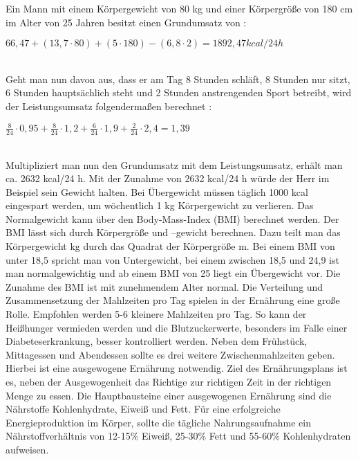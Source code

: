 	\setlength{\parindent}{0pt}Ein Mann mit einem Körpergewicht von 80 kg und einer Körpergröße von 180 cm im Alter von 25 Jahren besitzt einen Grundumsatz von \cite{SG}:\newline
	\\
		\centerline{$66,47 + (13,7 \cdot 80) + (5 \cdot 180) - (6,8 \cdot 2) {=} 1892,47 kcal/24 h $}\newline
	\\
	Geht man nun davon aus, dass er am Tag 8 Stunden schläft, 8 Stunden nur sitzt, 6 Stunden hauptsächlich steht und 2 Stunden anstrengenden Sport betreibt, wird der Leistungsumsatz folgendermaßen berechnet \cite{SG}:\newline
		\\
		\centerline{$\frac{8}{24} \cdot 0,95 + \frac {8}{24} \cdot 1,2 + \frac{6}{24} \cdot 1,9 + \frac {2}{24} \cdot 2,4 {=} 1,39$}\newline
		\\
	Multipliziert man nun den Grundumsatz mit dem Leistungsumsatz, erhält man ca. 2632 kcal/24 h. Mit der Zunahme von 2632 kcal/24 h würde der Herr im Beispiel sein Gewicht halten. Bei Übergewicht müssen täglich 1000 kcal eingespart werden, um wöchentlich 1 kg Körpergewicht zu verlieren.\newline
	Das Normalgewicht kann über den Body-Mass-Index (BMI) berechnet werden. Der BMI lässt sich durch Körpergröße und –gewicht berechnen. Dazu teilt man das Körpergewicht kg durch das Quadrat der Körpergröße m.\newline
	Bei einem BMI von unter 18,5 spricht man von Untergewicht, bei einem zwischen 18,5 und 24,9 ist man normalgewichtig und ab einem BMI von 25 liegt ein Übergewicht vor. Die Zunahme des BMI ist mit zunehmendem Alter normal.\newline
	Die Verteilung und Zusammensetzung der Mahlzeiten pro Tag spielen in der Ernährung eine große Rolle. Empfohlen werden 5-6 kleinere Mahlzeiten pro Tag. So kann der Heißhunger vermieden werden und die Blutzuckerwerte, besonders im Falle einer Diabeteserkrankung, besser kontrolliert werden. Neben dem Frühstück, Mittagessen und Abendessen sollte es drei weitere Zwischenmahlzeiten geben. Hierbei ist eine ausgewogene Ernährung notwendig. Ziel des Ernährungsplans ist es, neben der Ausgewogenheit das Richtige zur richtigen Zeit in der richtigen Menge zu essen. Die Hauptbausteine einer ausgewogenen Ernährung sind die Nährstoffe Kohlenhydrate, Eiweiß und Fett. Für eine erfolgreiche Energieproduktion im Körper, sollte die tägliche Nahrungsaufnahme ein Nährstoffverhältnis von 12-15\% Eiweiß, 25-30\% Fett und 55-60\% Kohlenhydraten aufweisen. \cite{SG} 
		

